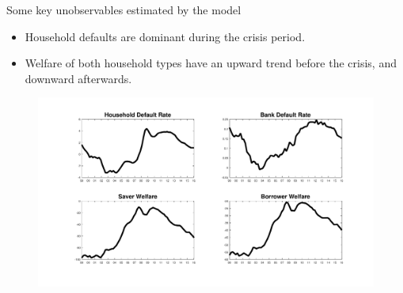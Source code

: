 \documentclass[8pt,aspectratio=169]{beamer}
\numberwithin{equation}{section}
\begin{document}
\begin{frame}{Some key unobservables estimated by the model}

\begin{itemize}
\item Household defaults are dominant during the crisis period.
\item Welfare of both household types have an upward trend before the crisis, and downward afterwards.

\end{itemize}    

\begin{figure}
\includegraphics[scale=0.25]{smoothed_variables.pdf}
\end{figure}


\end{frame}
\end{document}
